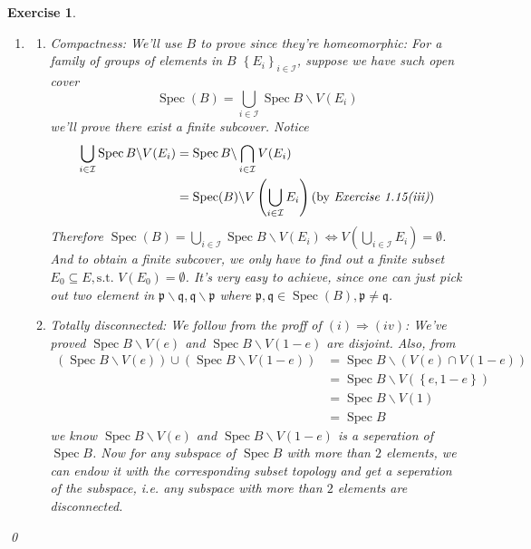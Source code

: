 \documentclass{article}
\theoremstyle{breakstyle}
\newtheorem{exercise}{Exercise}
\DeclareMathOperator{\spec}{Spec}
\begin{document}
\begin{exercise}
\begin{enumerate}[label=({\Roman*})]
        \item 
            \begin{enumerate}[label=({\roman*})]
                \item \emph{Compactness}:
                    We'll use $B$ to prove since they're homeomorphic:
                    For a family of groups of elements in $B$ $\left\{ E_{i} \right\} _{i\in \mathcal{I}}$,
                    suppose we have such open cover
                    $$
                    \spec(B)=\bigcup _{i \in \mathcal{I}} \spec{B}\backslash V(E_{i})
                    $$
                    we'll prove there exist a finite subcover.
                    Notice
                    \begin{align*}
                    \bigcup _{i \in \mathcal{I}} \spec{B}\backslash V(E_{i})
                    &= \spec{B}\backslash \bigcap _{i \in \mathcal{I}} V(E_{i}) \\
                    &= \spec(B)\backslash V\left( \bigcup _{i \in \mathcal{I}} E_{i} \right) \text{(by \emph{Exercise 1.15(iii)})}
                    \end{align*}
                    Therefore $\spec(B)=\bigcup _{i \in \mathcal{I}} \spec{B}\backslash V(E_{i})\Leftrightarrow V\left( \bigcup _{i \in \mathcal{I}} E_{i} \right) =\emptyset$.
                    And to obtain a finite subcover, we only have to find out a finite subset $E_0\subseteq E,\text{s.t. }V\left( E_0 \right) =\emptyset$.
                    It's very easy to achieve, since one can just pick out two element in $\mathfrak{p}\backslash \mathfrak{q},\mathfrak{q}\backslash \mathfrak{p}$ where $\mathfrak{p,q}\in \spec(B),\mathfrak{p}\neq \mathfrak{q}$.
                \item \emph{Totally disconnected}:
                    We follow from the proff of $(i)\Rightarrow (iv)$:
                    We've proved $\spec{B}\backslash V(e)$ and $\spec{B}\backslash V(1-e)$ are disjoint.
                    Also, from
                    \begin{align*}
                        \left( \spec{B}\backslash V(e) \right) \cup \left( \spec{B}\backslash V(1-e) \right) 
                        &= \spec{B}\backslash \left( V(e)\cap V(1-e) \right)  \\
                        &= \spec{B}\backslash V(\left\{ e,1-e \right\} ) \\
                        &= \spec{B}\backslash V(1) \\
                        &= \spec{B}
                    \end{align*}
                    we know $\spec{B}\backslash V(e)$ and $\spec{B}\backslash V(1-e)$ is a seperation of $\spec{B}$.
                    Now for any subspace of $\spec{B}$ with more than $2$ elements,
                    we can endow it with the corresponding subset topology and get a seperation of the subspace, i.e. any subspace with more than $2$ elements are disconnected.
            \end{enumerate}
    \end{enumerate}
    \qed
\end{exercise}
\end{document}
